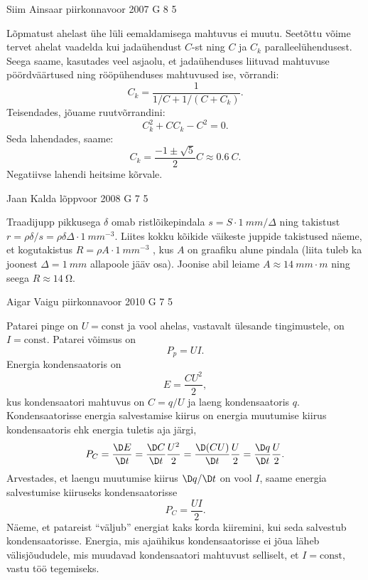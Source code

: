 \documentclass[11pt]{article}
\begin{document}
{%
{Siim Ainsaar} %
{piirkonnavoor} %
{2007} %
{G 8} %
{5} %
{

\ifSolution
Lõpmatust ahelast ühe lüli eemaldamisega mahtuvus ei muutu. Seetõttu võime tervet ahelat vaadelda kui jadaühendust $C$-st ning $C$ ja $C_k$ paralleelühendusest. Seega saame, kasutades veel asjaolu, et jadaühenduses liituvad mahtuvuse pöördväärtused ning rööpühenduses mahtuvused ise, võrrandi:
\[
C_{k}=\frac{1}{1 / C+1 /\left(C+C_{k}\right)}.
\]
Teisendades, jõuame ruutvõrrandini:
\[
C_{k}^{2}+C C_{k}-C^{2}=0.
\]
Seda lahendades, saame:
\[
C_{k}=\frac{-1 \pm \sqrt{5}}{2} C \approx \SI{0,6}{C}.
\]
Negatiivse lahendi heitsime kõrvale.
\fi
}

{Jaan Kalda} %
{lõppvoor} %
{2008} %
{G 7} %
{5} %
{

\ifSolution
Traadijupp pikkusega $\delta$ omab ristlõikepindala $s = S \cdot \SI{1}{mm}/\Delta$ ning takistust $r = \rho \delta /s = \rho \delta \Delta \cdot \SI{1}{mm^{-3}}$. Liites kokku kõikide väikeste juppide takistused näeme, et kogutakistus $R = \rho A \cdot \SI{1}{mm^{-3}}$ , kus $A$ on graafiku alune pindala (liita tuleb ka joonest $\Delta = \SI{1}{mm}$ allapoole jääv osa). Joonise abil leiame $A \approx \SI{14}{mm\cdot m}$ ning seega $R \approx \SI{14}{\ohm}$. 
\fi
}

{Aigar Vaigu} %
{piirkonnavoor} %
{2010} %
{G 7} %
{5} %
{

\ifSolution
Patarei pinge on $U=\text{const}$ ja vool ahelas, vastavalt ülesande tingimustele, on $I=\text{const}$. Patarei võimsus on
\[P_p=UI. \]
Energia kondensaatoris on
\[E=\frac{CU^2}{2}, \]
kus kondensaatori mahtuvus on $C=q/U$ ja laeng kondensaatoris $q$.
Kondensaatorisse energia salvestamise kiirus on energia muutumise kiirus kondensaatoris ehk energia tuletis aja järgi,
\[P_C=\frac{\D E}{\D t}=\frac{\D C}{\D t}\frac{U^2}{2}=\frac{\D (CU)}{\D t}\frac{U}{2}=\frac{\D q}{\D t}\frac{U}{2}.\]
Arvestades, et laengu muutumise kiirus $\D q/\D t$ on vool $I$, saame energia salvestumise kiiruseks kondensaatorisse
\[P_C=\frac{UI}{2}.\]
Näeme, et patareist \enquote{väljub} energiat kaks korda kiiremini, kui seda salvestub kondensaatorisse. Energia, mis ajaühikus kondensaatorisse ei jõua läheb välisjõududele, mis muudavad kondensaatori mahtuvust selliselt, et $I=\text{const}$, vastu töö tegemiseks.
\fi
}

}
\end{document}
